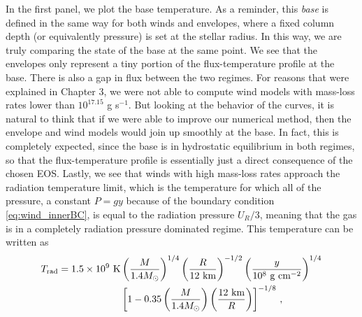 \documentclass[../main.tex]{subfiles}
\begin{document}
In the first panel, we plot the base temperature. As a reminder, this \textit{base} is defined in the same way for both winds and envelopes, where a fixed column depth (or equivalently pressure) is set at the stellar radius. In this way, we are truly comparing the state of the base at the same point. We see that the envelopes only represent a tiny portion of the flux-temperature profile at the base. There is also a gap in flux between the two regimes. For reasons that were explained in Chapter 3, we were not able to compute wind models with mass-loss rates lower than $10
^{17.15}$ g s$^{-1}$. But looking at the behavior of the curves, it is natural to think that  if we were able to improve our numerical method, then the envelope and wind models would join up smoothly at the base. In fact, this is completely expected, since the base is in hydrostatic equilibrium in both regimes, so that the flux-temperature profile is essentially just a direct consequence of the chosen EOS. Lastly, we see that winds with high mass-loss rates approach the radiation temperature limit, which is the temperature for which all of the pressure, a constant $P=gy$ because of the boundary condition \ref{eq:wind_innerBC}, is equal to the radiation pressure $U_R/3$, meaning that the gas is in a completely radiation pressure dominated regime. This temperature can be written as
\begin{align}\label{eq:Trad}
    T_\text{rad}=1.5\times 10^9\text{ K}&\left(\frac{M}{1.4M_\odot}\right)^{1/4}\left(\frac{R}{12\text{ km}}\right)^{-1/2}\left(\frac{y}{10^8 \text{ g cm}^{-2}}\right)^{1/4}\nonumber\\
    &\left[1-0.35\left(\frac{M}{1.4M_\odot}\right)\left(\frac{12\text{ km}}{R}\right)\right]^{-1/8}\,,
\end{align}

\newpage
\end{document}
